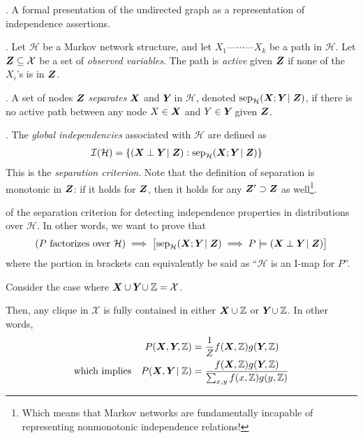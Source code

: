 \documentclass[11pt]{article}
\begin{document}
\myspace
\p {}. A formal presentation of the undirected graph as a representation of independence assertions.
\begin{compactitem}
	\item {}. Let $\mathcal H$ be a Markov network structure, and let $X_1 \text{---} \cdots \text{---} X_k$ be a path in $\mathcal H$. Let $\bm{Z}_{} \subseteq \mathcal{X}$ be a set of \textit{observed variables}. The path is \textit{active} given $\bm{Z}_{}$ if none of the $X_i$'s is in $\bm{Z}_{}$. 
	
	\item {}. A set of nodes $\bm{Z}_{}$ \textit{separates} $\bm{X}_{}$ and $\bm{Y}_{}$ in $\mathcal H$, denoted $\text{sep}_{\mathcal H}(\bm{X}_{} ; \bm{Y}_{} \mid \bm{Z}_{})$, if there is no active path between any node $X \in \bm{X}_{}$ and $Y \in \bm{Y}_{}$ given $\bm{Z}_{}$. 
	
	\item {}. The \textit{global independencies} associated with $\mathcal H$ are defined as
	\begin{align}
		\mathcal{I}(\mathcal H) &= \{  (\bm{X}_{} \perp \bm{Y}_{} \mid \bm{Z}_{}) : \text{sep}_{\mathcal H}(\bm{X}_{} ; \bm{Y}_{} \mid \bm{Z}_{})  \}
	\end{align}
	This is the \textit{separation criterion}. Note that the definition of separation is monotonic in $\bm{Z}_{}$: if it holds for $\bm{Z}_{}$, then it holds for any $\bm{Z}_{}' \supset \bm{Z}_{}$ as well\footnote{Which means that Markov networks are fundamentally incapable of representing nonmonotonic independence relations!}.
	
	\item {} of the separation criterion for detecting independence properties in distributions over $\mathcal{H}$. In other words, we want to prove that $$(P \text{ factorizes over }\mathcal{H}) \implies \big[\text{sep}_{\mathcal{H}} (\bm{X}_{} ; \bm{Y}_{} \mid \bm{Z}_{}) \implies P \models (\bm{X}_{} \perp \bm{Y}_{} \mid \bm{Z}_{})\big]$$where the portion in brackets can equivalently be said as ``$\mathcal{H}$ is an I-map for $P$''. \\
	\begin{example}[Proof]
	\begin{compactitem}
		\item Consider the case where $\bm{X}_{} \cup \bm{Y}_{} \cup \mathbb{Z} = \mathcal{X}$. 
		
		\item Then, any clique in $\mathcal{X}$ is fully contained in either $\bm{X}_{} \cup \mathbb{Z}$ or $\bm{Y}_{} \cup \mathbb{Z}$. In other words,
		\begin{align}
			P(\bm{X}_{}, \bm{Y}_{}, \mathbb{Z}) &= \frac{1}{Z} f(\bm{X}_{}, \mathbb{Z}) g(\bm{Y}_{}, \mathbb{Z}) \\
			\text{which implies}\quad
			P(\bm{X}_{}, \bm{Y}_{} \mid \mathbb{Z}) &= \dfrac{
				f(\bm{X}_{}, \mathbb{Z}) g(\bm{Y}_{}, \mathbb{Z})
				}{
				\sum_{x, y} f(x, \mathbb{Z}) g(y, \mathbb{Z})
				}
		\end{align}
		

\end{compactitem}
\end{example}
\end{compactitem}
\end{document}

